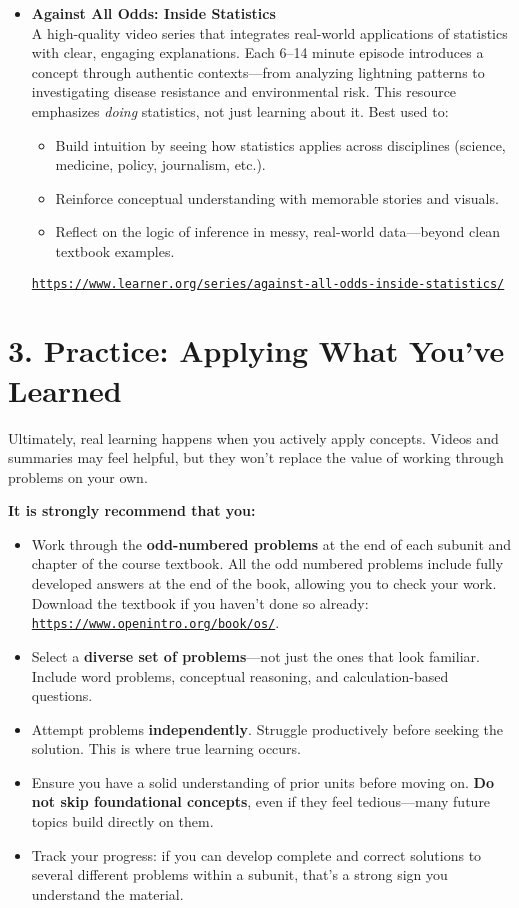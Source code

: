 \documentclass[12pt]{article}
\begin{document}
\begin{itemize}
    \item \textbf{Against All Odds: Inside Statistics} \\
    A high-quality video series that integrates real-world applications of statistics with clear, engaging explanations. Each 6–14 minute episode introduces a concept through authentic contexts—from analyzing lightning patterns to investigating disease resistance and environmental risk. This resource emphasizes \emph{doing} statistics, not just learning about it.
        Best used to:
        \begin{itemize}
            \item Build intuition by seeing how statistics applies across disciplines (science, medicine, policy, journalism, etc.).
            \item Reinforce conceptual understanding with memorable stories and visuals.
            \item Reflect on the logic of inference in messy, real-world data—beyond clean textbook examples.
        \end{itemize}

\href{https://www.learner.org/series/against-all-odds-inside-statistics/}{\texttt{https://www.learner.org/series/against-all-odds-inside-statistics/}}

\end{itemize}

\section*{3. Practice: Applying What You’ve Learned}

Ultimately, real learning happens when you actively apply concepts. Videos and summaries may feel helpful, but they won’t replace the value of working through problems on your own.

\textbf{It is strongly recommend that you:}
\begin{itemize}
    \item Work through the \textbf{odd-numbered problems} at the end of each subunit and chapter of the course textbook. All the odd numbered problems include fully developed answers at the end of the book, allowing you to check your work. Download the textbook if you haven't done so already:   \href{https://www.openintro.org/book/os/}{\texttt{https://www.openintro.org/book/os/}}.
    \item Select a \textbf{diverse set of problems}—not just the ones that look familiar. Include word problems, conceptual reasoning, and calculation-based questions.
    \item Attempt problems \textbf{independently}. Struggle productively before seeking the solution. This is where true learning occurs.
    \item Ensure you have a solid understanding of prior units before moving on. \textbf{Do not skip foundational concepts}, even if they feel tedious—many future topics build directly on them.
    \item Track your progress: if you can develop complete and correct solutions to several different problems within a subunit, that’s a strong sign you understand the material.
\end{itemize}
\end{document}
